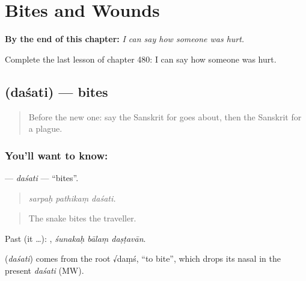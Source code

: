 
\chapter{Bites and Wounds}
\label{ch:sa-bites-and-wounds}

\begin{chapteropening}
\textbf{By the end of this chapter:} \emph{I can say how someone was hurt.}

Complete the last lesson of chapter 480: I can say how someone was hurt.
\end{chapteropening}

\section[\texorpdfstring{\sk{दशति} (daśati)}{दशति (daśati)}]{ (daśati) — bites}

\label{lesson:SA-C480-dasati}



\begin{quote}
Before the new one: say the Sanskrit for goes about, then the Sanskrit for a plague.
\end{quote}

\subsection*{You'll want to know: }
\textbf{} — \emph{daśati} — \textquotedblleft{}bites\textquotedblright{}.

\begin{quote}
  
\end{quote}

\begin{quote}
\emph{sarpaḥ pathikaṃ daśati.}
\end{quote}

\begin{quote}
The snake bites the traveller.
\end{quote}

Past (it …):   , \emph{śunakaḥ bālaṃ daṣṭavān}.

\begin{cousinweb}
\textbf{} (\emph{daśati}) comes from the root √daṃś, \textquotedblleft{}to bite\textquotedblright{}, which drops its nasal in the present \emph{daśati} (MW).
\end{cousinweb}

